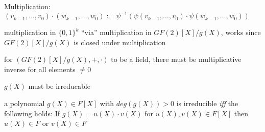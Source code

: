 \documentclass[landscape, a4paper]{article}
\begin{document}
\begin{minipage}[t]{0.2\linewidth}
\begin{betterlist}
\begin{betterlist}
\begin{betterlist}
				\item \alert{Multiplication}: $\left(v_{k-1}, \ldots, v_0\right) \cdot\left(w_{k-1}, \ldots, w_0\right):=\psi^{-1}\left(\psi\left(v_{k-1}, \ldots, v_0\right) \cdot \psi\left(w_{k-1}, \ldots, w_0\right)\right)$
				\begin{betterlist}
					\item multiplication in $\{0,1\}^k$ \enquote{via} multiplication in $GF(2)[X]/g(X)$, works since $GF(2)[X]/g(X)$ is closed under multiplication%
				\end{betterlist}
			\end{betterlist}
			\begin{betterlist}
				\item for $(GF(2)[X]/g(X), +, \cdot)$ to be a field, there must be multiplicative inverse for all elements $\ne 0$
				\begin{betterlist}
					\item $g(X)$ must be \alert{irreducable}
					\item a polynomial $g(X) \in F[X]$ with $deg(g(X)) > 0$ is \alert{irreducible} \textit{iff} the following holds: If $g(X) = u(X) \cdot v(X)$ for $u(X), v(X) \in F[X]$ then $u(X) \in F$ or $v(X) \in F$
					\begin{betterlist}

\end{betterlist}
\end{betterlist}
\end{betterlist}
\end{betterlist}
\end{betterlist}
\end{minipage}
\end{document}
